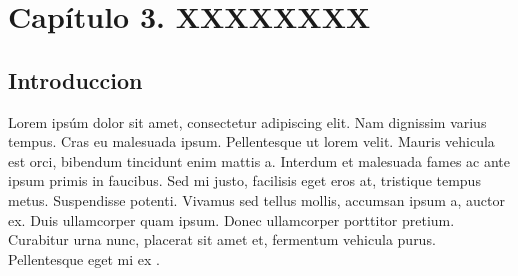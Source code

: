 \chapter{Capítulo 3. XXXXXXXX}

\section{Introduccion}

Lorem ipsúm dolor sit amet, consectetur adipiscing elit. Nam dignissim varius tempus. Cras eu malesuada ipsum. Pellentesque ut lorem velit. Mauris vehicula est orci, bibendum tincidunt enim mattis a. Interdum et malesuada fames ac ante ipsum primis in faucibus. Sed mi justo, facilisis eget eros at, tristique tempus metus. Suspendisse potenti. Vivamus sed tellus mollis, accumsan ipsum a, auctor ex. Duis ullamcorper quam ipsum. Donec ullamcorper porttitor pretium. Curabitur urna nunc, placerat sit amet et, fermentum vehicula purus. Pellentesque eget mi ex \cite{Chevalereau2}.